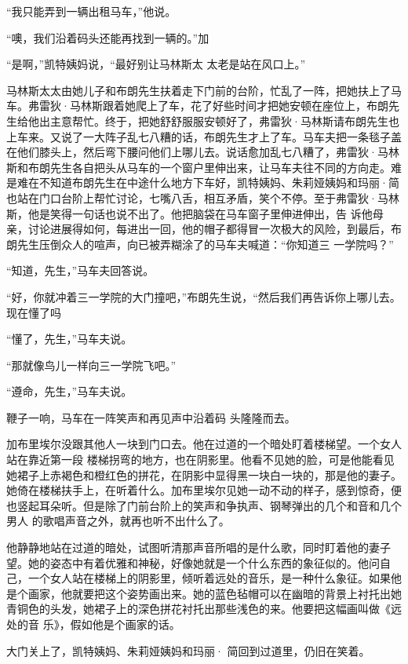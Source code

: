 \documentclass{article}
\begin{document}
\newpage


“我只能弄到一辆出租马车，”他说。 

“噢，我们沿着码头还能再找到一辆的。”加

“是啊，”凯特姨妈说，“最好别让马林斯太
太老是站在风口上。” 

马林斯太太由她儿子和布朗先生扶着走下门前的台阶，忙乱了一阵，把她扶上了马车。弗雷狄·马林斯跟着她爬上了车，花了好些时间才把她安顿在座位上，布朗先生给他出主意帮忙。终于，把她舒舒服服安顿好了，弗雷狄·马林斯请布朗先生也上车来。又说了一大阵子乱七八糟的话，布朗先生才上了车。马车夫把一条毯子盖在他们膝头上，然后弯下腰问他们上哪儿去。说话愈加乱七八糟了，弗雷狄·马林斯和布朗先生各自把头从马车的一个窗户里伸出来，让马车夫往不同的方向走。难是难在不知道布朗先生在中途什么地方下车好，凯特姨妈、朱莉娅姨妈和玛丽·简也站在门口台阶上帮忙讨论，七嘴八舌，相互矛盾，笑个不停。至于弗雷狄·马林斯，他是笑得一句话也说不出了。他把脑袋在马车窗子里伸进伸出，告
\newpage
诉他母亲，讨论进展得如何，每进出一回，他的帽子都得冒一次极大的风险，到最后，布朗先生压倒众人的喧声，向已被弄糊涂了的马车夫喊道：“你知道三
一学院吗？” 


“知道，先生，”马车夫回答说。 

“好，你就冲着三一学院的大门撞吧，”布朗先生说，“然后我们再告诉你上哪儿去。现在懂了吗


“懂了，先生，”马车夫说。 


“那就像鸟儿一样向三一学院飞吧。” 


“遵命，先生，”马车夫说。 

鞭子一响，马车在一阵笑声和再见声中沿着码
头隆隆而去。 

加布里埃尔没跟其他人一块到门口去。他在过道的一个暗处盯着楼梯望。一个女人站在靠近第一段
\newpage
楼梯拐弯的地方，也在阴影里。他看不见她的脸，可是他能看见她裙子上赤褐色和橙红色的拼花，在阴影中显得黑一块白一块的，那是他的妻子。她倚在楼梯扶手上，在听着什么。加布里埃尔见她一动不动的样子，感到惊奇，便也竖起耳朵听。但是除了门前台阶上的笑声和争执声、钢琴弹出的几个和音和几个男人
的歌唱声音之外，就再也听不出什么了。 

他静静地站在过道的暗处，试图听清那声音所唱的是什么歌，同时盯着他的妻子望。她的姿态中有着优雅和神秘，好像她就是一个什么东西的象征似的。他问自己，一个女人站在楼梯上的阴影里，倾听着远处的音乐，是一种什么象征。如果他是个画家，他就要把这个姿势画出来。她的蓝色毡帽可以在幽暗的背景上衬托出她青铜色的头发，她裙子上的深色拼花衬托出那些浅色的来。他要把这幅画叫做《远处的音
乐》，假如他是个画家的话。 

大门关上了，凯特姨妈、朱莉娅姨妈和玛丽·
简回到过道里，仍旧在笑着。 
\end{document}
